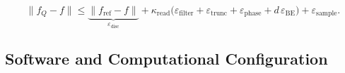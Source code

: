 \begin{equation}
    \|f_Q - f\| \le
    \underbrace{\|f_{\mathrm{ref}} - f\|}_{\varepsilon_{\mathrm{disc}}}
    + \kappa_{\mathrm{read}}\bigl(\varepsilon_{\mathrm{filter}} + \varepsilon_{\mathrm{trunc}} + \varepsilon_{\mathrm{phase}} + d\,\varepsilon_{\mathrm{BE}}\bigr)
    + \varepsilon_{\mathrm{sample}} .
    \label{eq:error-budget}
\end{equation}

\subsection{Software and Computational Configuration}
\label{sec:pipeline-software}

